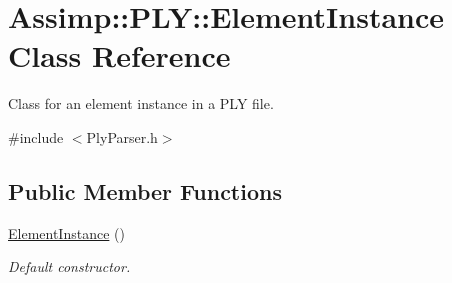 \hypertarget{class_assimp_1_1_p_l_y_1_1_element_instance}{\section{Assimp\+:\+:P\+L\+Y\+:\+:Element\+Instance Class Reference}
\label{class_assimp_1_1_p_l_y_1_1_element_instance}
}


Class for an element instance in a P\+L\+Y file.  




{\ttfamily \#include $<$Ply\+Parser.\+h$>$}

\subsection*{Public Member Functions}
\begin{DoxyCompactItemize}
\item 
\hypertarget{class_assimp_1_1_p_l_y_1_1_element_instance_a40f85e42d9183ae6470a5ec4fed2adc4}{\hyperlink{class_assimp_1_1_p_l_y_1_1_element_instance_a40f85e42d9183ae6470a5ec4fed2adc4}{Element\+Instance} ()}\label{class_assimp_1_1_p_l_y_1_1_element_instance_a40f85e42d9183ae6470a5ec4fed2adc4}

\begin{DoxyCompactList}\small\item\em Default constructor. \end{DoxyCompactList}\end{DoxyCompactItemize}
